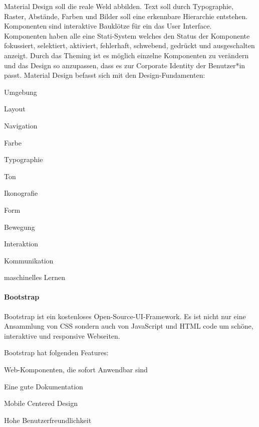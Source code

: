 Material Design soll die reale Weld abbilden.
Text soll durch Typographie, Raster, Abstände, Farben und Bilder soll eine erkennbare Hierarchie entstehen. Komponenten sind interaktive Bauklötze für ein das User Interface. Komponenten haben alle eine Stati-System welches den Status der Komponente fokussiert, selektiert, aktiviert, fehlerhaft, schwebend, gedrückt und ausgeschalten anzeigt. Durch das Theming ist es möglich einzelne Komponenten zu verändern und das Design so anzupassen, dass es zur Corporate Identity der Benutzer*in passt.
Material Design befasst sich mit den Design-Fundamenten:
\begin{compactitem}
    \item Umgebung
    \item Layout
    \item Navigation
    \item Farbe
    \item Typographie
    \item Ton
    \item Ikonografie
    \item Form
    \item Bewegung
    \item Interaktion
    \item Kommunikation
    \item maschinelles Lernen
\end{compactitem}
\cite{MaterialDesign-Introduction}

\paragraph{Bootstrap}
Bootstrap ist ein kostenloses Open-Source-UI-Framework. Es ist nicht nur eine Ansammlung von CSS sondern auch von JavaScript und HTML code um schöne, interaktive und responsive Webseiten. 

Bootstrap hat folgenden Features: 
\begin{compactitem}
    \item Web-Komponenten, die sofort Anwendbar sind
    \item Eine gute Dokumentation
    \item Mobile Centered Design
    \item Hohe Benutzerfreundlichkeit
\end{compactitem}
\cite{BestCSSFrameworksin2022}

